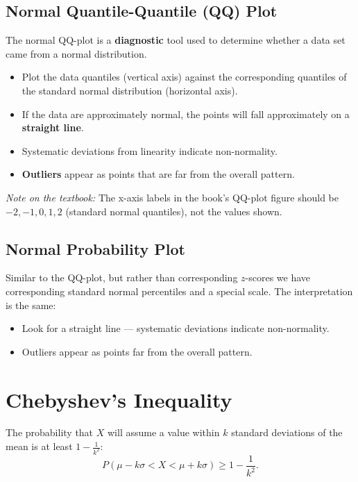 \documentclass[10pt]{report}
\begin{document}
\subsection{Normal Quantile-Quantile (QQ) Plot}

The normal QQ-plot is a \textbf{diagnostic} tool used to determine whether a data set came from a normal distribution.

\begin{itemize}
  \item Plot the data quantiles (vertical axis) against the corresponding quantiles of the standard normal distribution (horizontal axis).
  \item If the data are approximately normal, the points will fall approximately on a \textbf{straight line}.
  \item Systematic deviations from linearity indicate non-normality.
  \item \textbf{Outliers} appear as points that are far from the overall pattern.
\end{itemize}

\textit{Note on the textbook:} The x-axis labels in the book's QQ-plot figure should be $-2, -1, 0, 1, 2$ (standard normal quantiles), not the values shown.

\subsection{Normal Probability Plot}

Similar to the QQ-plot, but rather than corresponding $z$-scores we have corresponding standard normal percentiles and a special scale. The interpretation is the same:
\begin{itemize}
  \item Look for a straight line --- systematic deviations indicate non-normality.
  \item Outliers appear as points far from the overall pattern.
\end{itemize}

\section{Chebyshev's Inequality}

\begin{tcolorbox}[colback=softpink!15, colframe=softpink!60!black, title=Theorem: Chebyshev's Inequality]
The probability that $X$ will assume a value within $k$ standard deviations of the mean is at least $1 - \frac{1}{k^2}$:
\[
P\!\left(\mu - k\sigma < X < \mu + k\sigma\right) \geq 1 - \frac{1}{k^2}.
\]
\end{tcolorbox}
\end{document}
